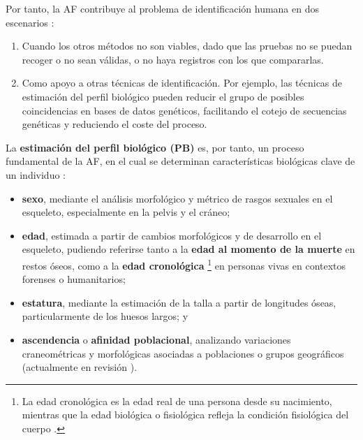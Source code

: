 Por tanto, la AF contribuye al problema de identificación humana en dos escenarios \cite{swganth2010}:  

\begin{enumerate}

    \item Cuando los otros métodos no son viables, dado que las pruebas no se puedan recoger o no sean 
    válidas, o no haya registros con los que compararlas.
    
    \item Como apoyo a otras técnicas de identificación. Por ejemplo, las técnicas de estimación del perfil 
    biológico pueden reducir el grupo de posibles coincidencias en bases de datos genéticos, facilitando el 
    cotejo de secuencias genéticas y reduciendo el coste del proceso.  

\end{enumerate}

La \textbf{estimación del perfil biológico (PB)} es, por tanto, un proceso fundamental de la AF, en el cual
se determinan características biológicas clave de un individuo \cite{byers2023}: 

\begin{itemize}

    \item \textbf{sexo}, mediante el análisis morfológico y métrico de rasgos sexuales en el esqueleto, 
    especialmente en la pelvis y el cráneo;
    
    \item \textbf{edad}, estimada a partir de cambios morfológicos y de desarrollo en el esqueleto, pudiendo 
    referirse tanto a la \textbf{edad al momento de la muerte} en restos óseos, como a la \textbf{edad 
    cronológica}
    \footnote{
        La edad cronológica es la edad real de una persona desde su nacimiento, mientras que la edad biológica
        o fisiológica refleja la condición fisiológica del cuerpo \cite{marcante2025}.
    }
    en personas vivas en contextos forenses o humanitarios;
    
    \item \textbf{estatura}, mediante la estimación de la talla a partir de longitudes óseas, particularmente 
    de los huesos largos; y
    
    \item \textbf{ascendencia} o \textbf{afinidad poblacional}, analizando variaciones craneométricas y 
    morfológicas asociadas a poblaciones o grupos geográficos (actualmente en revisión \cite{ross2021a, 
    ross2021b, flouri2022}).

\end{itemize}


